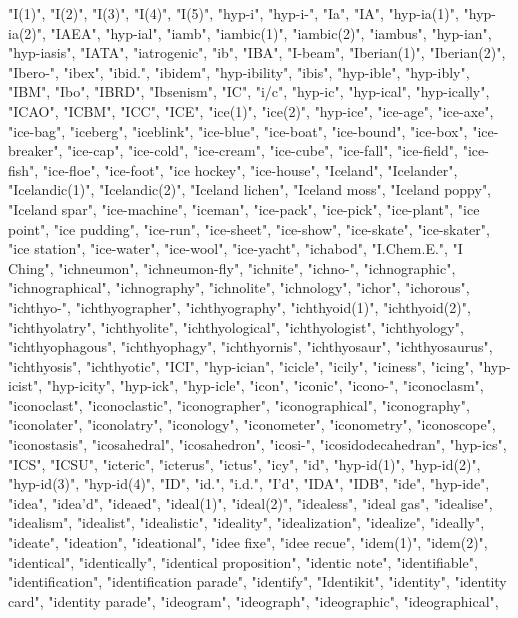"I(1)",
"I(2)",
"I(3)",
"I(4)",
"I(5)",
"hyp-i",
"hyp-i-",
"Ia",
"IA",
"hyp-ia(1)",
"hyp-ia(2)",
"IAEA",
"hyp-ial",
"iamb",
"iambic(1)",
"iambic(2)",
"iambus",
"hyp-ian",
"hyp-iasis",
"IATA",
"iatrogenic",
"ib",
"IBA",
"I-beam",
"Iberian(1)",
"Iberian(2)",
"Ibero-",
"ibex",
"ibid.",
"ibidem",
"hyp-ibility",
"ibis",
"hyp-ible",
"hyp-ibly",
"IBM",
"Ibo",
"IBRD",
"Ibsenism",
"IC",
"i/c",
"hyp-ic",
"hyp-ical",
"hyp-ically",
"ICAO",
"ICBM",
"ICC",
"ICE",
"ice(1)",
"ice(2)",
"hyp-ice",
"ice-age",
"ice-axe",
"ice-bag",
"iceberg",
"iceblink",
"ice-blue",
"ice-boat",
"ice-bound",
"ice-box",
"ice-breaker",
"ice-cap",
"ice-cold",
"ice-cream",
"ice-cube",
"ice-fall",
"ice-field",
"ice-fish",
"ice-floe",
"ice-foot",
"ice hockey",
"ice-house",
"Iceland",
"Icelander",
"Icelandic(1)",
"Icelandic(2)",
"Iceland lichen",
"Iceland moss",
"Iceland poppy",
"Iceland spar",
"ice-machine",
"iceman",
"ice-pack",
"ice-pick",
"ice-plant",
"ice point",
"ice pudding",
"ice-run",
"ice-sheet",
"ice-show",
"ice-skate",
"ice-skater",
"ice station",
"ice-water",
"ice-wool",
"ice-yacht",
"ichabod",
"I.Chem.E.",
"I Ching",
"ichneumon",
"ichneumon-fly",
"ichnite",
"ichno-",
"ichnographic",
"ichnographical",
"ichnography",
"ichnolite",
"ichnology",
"ichor",
"ichorous",
"ichthyo-",
"ichthyographer",
"ichthyography",
"ichthyoid(1)",
"ichthyoid(2)",
"ichthyolatry",
"ichthyolite",
"ichthyological",
"ichthyologist",
"ichthyology",
"ichthyophagous",
"ichthyophagy",
"ichthyornis",
"ichthyosaur",
"ichthyosaurus",
"ichthyosis",
"ichthyotic",
"ICI",
"hyp-ician",
"icicle",
"icily",
"iciness",
"icing",
"hyp-icist",
"hyp-icity",
"hyp-ick",
"hyp-icle",
"icon",
"iconic",
"icono-",
"iconoclasm",
"iconoclast",
"iconoclastic",
"iconographer",
"iconographical",
"iconography",
"iconolater",
"iconolatry",
"iconology",
"iconometer",
"iconometry",
"iconoscope",
"iconostasis",
"icosahedral",
"icosahedron",
"icosi-",
"icosidodecahedran",
"hyp-ics",
"ICS",
"ICSU",
"icteric",
"icterus",
"ictus",
"icy",
"id",
"hyp-id(1)",
"hyp-id(2)",
"hyp-id(3)",
"hyp-id(4)",
"ID",
"id.",
"i.d.",
"I'd",
"IDA",
"IDB",
"ide",
"hyp-ide",
"idea",
"idea'd",
"ideaed",
"ideal(1)",
"ideal(2)",
"idealess",
"ideal gas",
"idealise",
"idealism",
"idealist",
"idealistic",
"ideality",
"idealization",
"idealize",
"ideally",
"ideate",
"ideation",
"ideational",
"idee fixe",
"idee recue",
"idem(1)",
"idem(2)",
"identical",
"identically",
"identical proposition",
"identic note",
"identifiable",
"identification",
"identification parade",
"identify",
"Identikit",
"identity",
"identity card",
"identity parade",
"ideogram",
"ideograph",
"ideographic",
"ideographical",
